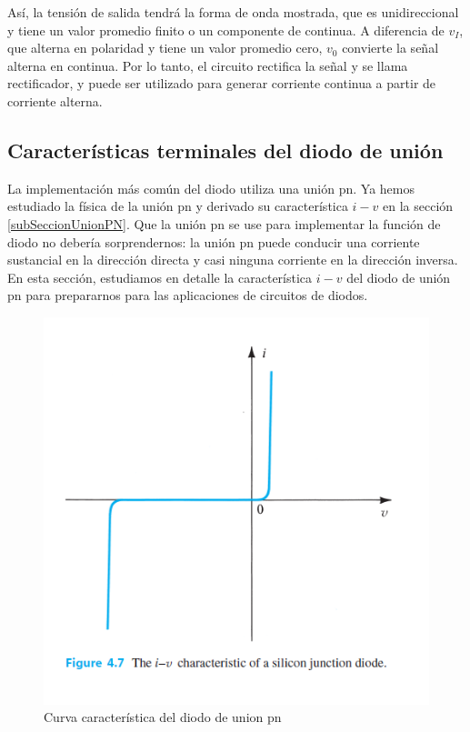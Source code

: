 Así, la tensión de salida tendrá la forma de onda mostrada, que es unidireccional y tiene un valor promedio finito o un componente de continua. A diferencia de \( v_I \), que alterna en polaridad y tiene un valor promedio cero, \( v_0 \) convierte la señal alterna en continua. Por lo tanto, el circuito rectifica la señal y se llama rectificador, y puede ser utilizado para generar corriente continua a partir de corriente alterna.

\subsection{Características terminales del diodo de unión}

La implementación más común del diodo utiliza una unión pn. Ya hemos estudiado la física de la unión pn y derivado su característica $i - v$ en la sección \ref{subSeccionUnionPN}. Que la unión pn se use para implementar la función de diodo no debería sorprendernos: la unión pn puede conducir una corriente sustancial en la dirección directa y casi ninguna corriente en la dirección inversa. En esta sección, estudiamos en detalle la característica $i - v$ del diodo de unión pn para prepararnos para las aplicaciones de circuitos de diodos.

\begin{figure}[H]
    \centering
    \includegraphics[scale=0.6]{Electronica/diodo_f3.png}
    \caption{Curva característica del diodo de union pn}
    \label{fig_curvaCaracteristicaDiodo}
\end{figure}

